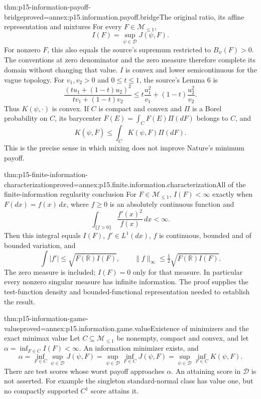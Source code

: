 \begin{hbtheorem}{thm:p15-information-payoff-bridge}{proved=annex:p15.information.payoff.bridge}{The original ratio, its affine representation and mixtures}
For every \(F\in\mathcal M_{\leq1}\),
\[
 I(F)=\sup_{\psi\in\mathcal D}J(\psi,F).
\]
For nonzero \(F\), this also equals the source's supremum restricted
to \(B_\psi(F)>0\). The conventions at zero denominator and the
zero measure therefore complete its domain without changing that value.
\(I\) is convex and lower semicontinuous for the vague topology.
For \(v_1,v_2>0\) and \(0\leq t\leq1\), the source's Lemma 6 is
\[
 \frac{(tu_1+(1-t)u_2)^2}{tv_1+(1-t)v_2}
 \leq t\frac{u_1^2}{v_1}+(1-t)\frac{u_2^2}{v_2}.
\]
Thus \(K(\psi,\cdot)\) is convex.
If \(C\) is compact and convex and \(\Pi\) is a Borel probability
on \(C\), its barycenter \(\overline F(E)=\int_C F(E)\Pi(dF)\)
belongs to \(C\), and
\[
 K(\psi,\overline F)\leq\int_C K(\psi,F)\Pi(dF).
\]
This is the precise sense in which mixing does not improve Nature's
minimum payoff.
\end{hbtheorem}

\begin{hbtheorem}{thm:p15-finite-information-characterization}{proved=annex:p15.finite.information.characterization}{All of the finite-information regularity conclusion}
For \(F\in\mathcal M_{\leq1}\), \(I(F)<\infty\) exactly when
\(F(dx)=f(x)\,dx\), where \(f\geq0\) is an absolutely continuous
function and
\[
 \int_{\{f>0\}}\frac{f'(x)^2}{f(x)}\,dx<\infty.
\]
Then this integral equals \(I(F)\), \(f'\in L^1(dx)\),
\(f\) is continuous, bounded and of bounded variation, and
\[
 \int|f'|\leq\sqrt{F(\mathbb R)I(F)},\qquad
 \|f\|_\infty\leq\tfrac12\sqrt{F(\mathbb R)I(F)}.
\]
The zero measure is included; \(I(F)=0\) only for that measure.
In particular every nonzero singular measure has infinite information.
The proof supplies the test-function density and bounded-functional
representation needed to establish the result.
\end{hbtheorem}

\begin{hbtheorem}{thm:p15-information-game-value}{proved=annex:p15.information.game.value}{Existence of minimizers and the exact minimax value}
Let \(C\subseteq\mathcal M_{\leq1}\) be nonempty, compact and convex,
and let \(\alpha=\inf_{F\in C}I(F)<\infty\).
An information minimizer exists, and
\[
 \alpha=\inf_{F\in C}\sup_{\psi\in\mathcal D}J(\psi,F)
       =\sup_{\psi\in\mathcal D}\inf_{F\in C}J(\psi,F)
       =\sup_{\psi\in\mathcal D}\inf_{F\in C}K(\psi,F).
\]
There are test scores whose worst payoff approaches \(\alpha\).
An attaining score in \(\mathcal D\) is not asserted.
For example the singleton standard-normal class has value one,
but no compactly supported \(C^1\) score attains it.
\end{hbtheorem}

